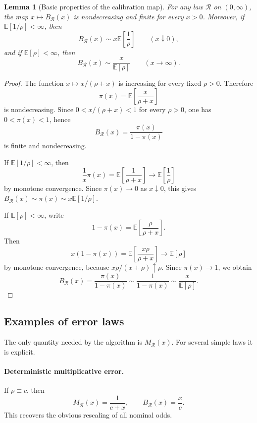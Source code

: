 \documentclass[11pt,a4paper]{article}
\newtheorem{lemma}{Lemma}
\begin{document}
\begin{lemma}[Basic properties of the calibration map]
\label{lem:calibration-properties}
For any law $\mathcal R$ on $(0,\infty)$, the map
$x\mapsto B_{\mathcal R}(x)$ is nondecreasing and finite for every $x>0$.
Moreover, if $\mathbb E[1/\rho]<\infty$, then
\[
  B_{\mathcal R}(x)
  \sim x\mathbb E\left[\frac1\rho\right]
  \qquad (x\downarrow0),
\]
and if $\mathbb E[\rho]<\infty$, then
\[
  B_{\mathcal R}(x)
  \sim \frac{x}{\mathbb E[\rho]}
  \qquad (x\to\infty).
\]
\end{lemma}

\begin{proof}
The function $x\mapsto x/(\rho+x)$ is increasing for every fixed $\rho>0$.
Therefore
\[
  \pi(x)=\mathbb E\left[\frac{x}{\rho+x}\right]
\]
is nondecreasing.  Since $0<x/(\rho+x)<1$ for every $\rho>0$, one has
$0<\pi(x)<1$, hence
\[
  B_{\mathcal R}(x)=\frac{\pi(x)}{1-\pi(x)}
\]
is finite and nondecreasing.

If $\mathbb E[1/\rho]<\infty$, then
\[
  \frac1x\pi(x)
  =\mathbb E\left[\frac1{\rho+x}\right]
  \longrightarrow
  \mathbb E\left[\frac1\rho\right]
\]
by monotone convergence.  Since $\pi(x)\to0$ as $x\downarrow0$, this gives
$B_{\mathcal R}(x)\sim \pi(x)\sim x\mathbb E[1/\rho]$.

If $\mathbb E[\rho]<\infty$, write
\[
  1-\pi(x)=\mathbb E\left[\frac{\rho}{\rho+x}\right].
\]
Then
\[
  x(1-\pi(x))
  =\mathbb E\left[\frac{x\rho}{\rho+x}\right]
  \longrightarrow
  \mathbb E[\rho]
\]
by monotone convergence, because $x\rho/(x+\rho)\uparrow\rho$.  Since
$\pi(x)\to1$, we obtain
\[
  B_{\mathcal R}(x)
  =\frac{\pi(x)}{1-\pi(x)}
  \sim \frac1{1-\pi(x)}
  \sim \frac{x}{\mathbb E[\rho]}.
\]
\end{proof}

\subsection{Examples of error laws}

The only quantity needed by the algorithm is $M_{\mathcal R}(x)$.  For several
simple laws it is explicit.

\paragraph{Deterministic multiplicative error.}
If $\rho\equiv c$, then
\[
  M_{\mathcal R}(x)=\frac1{c+x},
  \qquad
  B_{\mathcal R}(x)=\frac{x}{c}.
\]
This recovers the obvious rescaling of all nominal odds.
\end{document}
